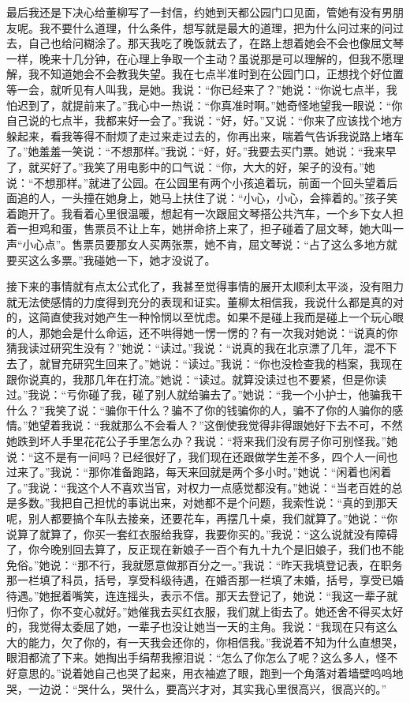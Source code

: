 \documentclass[12pt,oneside]{book}
\begin{document}
最后我还是下决心给董柳写了一封信，约她到天都公园门口见面，管她有没有男朋友呢。我不要什么道理，什么条件，想写就是最大的道理，把为什么问过来的问过去，自己也给问糊涂了。那天我吃了晚饭就去了，在路上想着她会不会也像屈文琴一样，晚来十几分钟，在心理上争取一个主动？虽说那是可以理解的，但我不愿理解，我不知道她会不会教我失望。我在七点半准时到在公园门口，正想找个好位置等一会，就听见有人叫我，是她。我说：``你已经来了？''她说：``你说七点半，我怕迟到了，就提前来了。''我心中一热说：``你真准时啊。''她奇怪地望我一眼说：``你自己说的七点半，我都来好一会了。''我说：``好，好。''又说：``你来了应该找个地方躲起来，看我等得不耐烦了走过来走过去的，你再出来，喘着气告诉我说路上堵车了。''她羞羞一笑说：``不想那样。''我说：``好，好。''我要去买门票。她说：``我来早了，就买好了。''我笑了用电影中的口气说：``你，大大的好，架子的没有。''她说：``不想那样。''就进了公园。在公园里有两个小孩追着玩，前面一个回头望着后面追的人，一头撞在她身上，她马上扶住了说：``小心，小心，会摔着的。''孩子笑着跑开了。我看着心里很温暖，想起有一次跟屈文琴搭公共汽车，一个乡下女人担着一担鸡和蛋，售票员不让上车，她拼命挤上来了，担子碰着了屈文琴，她大叫一声``小心点''。售票员要那女人买两张票，她不肯，屈文琴说：``占了这么多地方就要买这么多票。''我碰她一下，她才没说了。

接下来的事情就有点太公式化了，我甚至觉得事情的展开太顺利太平淡，没有阻力就无法使感情的力度得到充分的表现和证实。董柳太相信我，我说什么都是真的对的，这简直使我对她产生一种怜悯以至忧虑。如果不是碰上我而是碰上一个玩心眼的人，那她会是什么命运，还不哄得她一愣一愣的？有一次我对她说：``说真的你猜我读过研究生没有？''她说：``读过。''我说：``说真的我在北京漂了几年，混不下去了，就冒充研究生回来了。''她说：``读过。''我说：``你也没检查我的档案，我现在跟你说真的，我那几年在打流。''她说：``读过。就算没读过也不要紧，但是你读过。''我说：``亏你碰了我，碰了别人就给骗去了。''她说：``我一个小护士，他骗我干什么？''我笑了说：``骗你干什么？骗不了你的钱骗你的人，骗不了你的人骗你的感情。''她望着我说：``我就那么不会看人？''这倒使我觉得非得跟她好下去不可，不然她跌到坏人手里花花公子手里怎么办？我说：``将来我们没有房子你可别怪我。''她说：``这不是有一间吗？已经很好了，我们现在还跟做学生差不多，四个人一间也过来了。''我说：``那你准备跑路，每天来回就是两个多小时。''她说：``闲着也闲着了。''我说：``我这个人不喜欢当官，对权力一点感觉都没有。''她说：``当老百姓的总是多数。''我把自己担忧的事说出来，对她都不是个问题，我索性说：``真的到那天呢，别人都要搞个车队去接亲，还要花车，再摆几十桌，我们就算了。''她说：``你说算了就算了，你买一套红衣服给我穿，我要你买的。''我说：``这么说就没有障碍了，你今晚别回去算了，反正现在新娘子一百个有九十九个是旧娘子，我们也不能免俗。''她说：``那不行，我就愿意做那百分之一。''我说：``昨天我填登记表，在职务那一栏填了科员，括号，享受科级待遇，在婚否那一栏填了未婚，括号，享受已婚待遇。''她抿着嘴笑，连连摇头，表示不信。那天去登记了，她说：``我这一辈子就归你了，你不变心就好。''她催我去买红衣服，我们就上街去了。她还舍不得买太好的，我觉得太委屈了她，一辈子也没让她当一天的主角。我说：``我现在只有这么大的能力，欠了你的，有一天我会还你的，你相信我。''我说着不知为什么直想哭，眼泪都流了下来。她掏出手绢帮我擦泪说：``怎么了你怎么了呢？这么多人，怪不好意思的。''说着她自己也哭了起来，用衣袖遮了眼，跑到一个角落对着墙壁呜呜地哭，一边说：``哭什么，哭什么，要高兴才对，其实我心里很高兴，很高兴的。''
\end{document}
